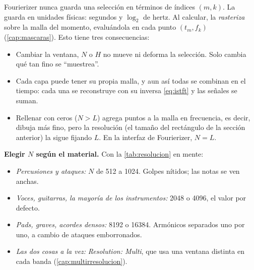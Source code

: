 Fourierizer nunca guarda una selección en términos de índices $(m,k)$. La guarda en unidades
físicas: segundos y $\log_2$ de hertz. Al calcular, la \emph{rasteriza} sobre la malla del momento,
evaluándola en cada punto $(t_m,f_k)$ (\cref{cap:mascaras}). Esto tiene tres consecuencias:
\begin{itemize}
  \item Cambiar la ventana, $N$ o $H$ no mueve ni deforma la selección. Solo cambia qué tan fino
        se ``muestrea''.
  \item Cada capa puede tener su propia malla, y aun así todas se combinan en el tiempo: cada
        una se reconstruye con su inversa \eqref{eq:istft} y las señales se suman.
  \item Rellenar con ceros ($N>L$) agrega puntos a la malla en frecuencia, es decir, dibuja más
        fino, pero la resolución (el tamaño del rectángulo de la sección anterior) la sigue
        fijando $L$. En la interfaz de Fourierizer, $N=L$.
\end{itemize}

\begin{estudio}
\textbf{Elegir $N$ según el material.} Con la \cref{tab:resolucion} en mente:
\begin{itemize}
  \item \emph{Percusiones y ataques:} $N$ de 512 a 1024. Golpes nítidos; las notas se ven anchas.
  \item \emph{Voces, guitarras, la mayoría de los instrumentos:} 2048 o 4096, el valor por
        defecto.
  \item \emph{Pads, graves, acordes densos:} 8192 o 16384. Armónicos separados uno por uno, a
        cambio de ataques emborronados.
  \item \emph{Las dos cosas a la vez:} \emph{Resolution: Multi}, que usa una ventana distinta en
        cada banda (\cref{cap:multirresolucion}).
\end{itemize}
\end{estudio}
